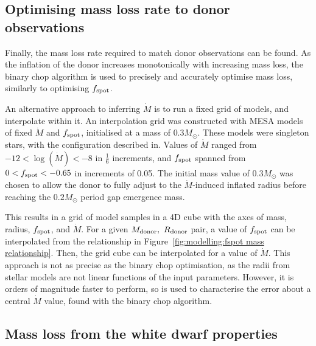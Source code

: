 \subsection{Optimising mass loss rate to donor observations}
\label{sect:modelling:optimising mass loss rate to observations}

Finally, the mass loss rate required to match donor observations can be found. As the inflation of the donor increases monotonically with increasing mass loss, the binary chop algorithm is used to precisely and accurately optimise mass loss, similarly to optimising $f_{\rm spot}$.

An alternative approach to inferring $\dot M$ is to run a fixed grid of models, and interpolate within it.
An interpolation grid was constructed with MESA models of fixed $\dot M$ and $f_{\rm spot}$, initialised at a mass of $0.3 M_\odot$. These models were singleton stars, with the configuration described in.
Values of $\dot M$ ranged from $-12<\log(\dot M)<-8$ in $\frac{1}{6}$ increments, and $f_{\rm spot}$ spanned from $0<f_{\rm spot}<-0.65$ in increments of 0.05. The initial mass value of $0.3 M_\odot$ was chosen to allow the donor to fully adjust to the $\dot M$-induced inflated radius before reaching the $0.2 M_\odot$ period gap emergence mass.

This results in a grid of model samples in a 4D cube with the axes of mass, radius, $f_{\rm spot}$, and $\dot M$.
For a given $M_{\rm donor},\ R_{\rm donor}$ pair, a value of $f_{\rm spot}$ can be interpolated from the relationship in Figure~\ref{fig:modelling:fspot mass relationship}. Then, the grid cube can be interpolated for a value of $\dot M$.
This approach is not as precise as the binary chop optimisation, as the radii from stellar models are not linear functions of the input parameters. However, it is orders of magnitude faster to perform, so is used to characterise the error about a central $\dot M$ value, found with the binary chop algorithm.



\subsection{Mass loss from the white dwarf properties}
\label{sect:modelling:mdot from WD temperature}

